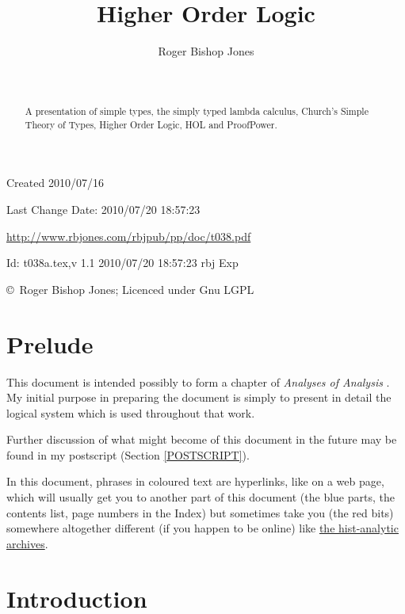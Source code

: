 \documentclass[11pt]{article}
\title{Higher Order Logic}
\author{Roger Bishop Jones}
\date{\ }
\begin{document}
\begin{titlepage}
\maketitle
\begin{abstract}
A presentation of simple types, the simply typed lambda calculus, Church's Simple Theory of Types, Higher Order Logic, HOL and ProofPower.
\end{abstract}
\vfill

\begin{centering}
{\footnotesize

Created 2010/07/16

Last Change $ $Date: 2010/07/20 18:57:23 $ $

\href{http://www.rbjones.com/rbjpub/pp/doc/t038.pdf}
{http://www.rbjones.com/rbjpub/pp/doc/t038.pdf}

$ $Id: t038a.tex,v 1.1 2010/07/20 18:57:23 rbj Exp $ $

\copyright\ Roger Bishop Jones; Licenced under Gnu LGPL

}%
\end{centering}

\thispagestyle{empty}
\end{titlepage}

\newpage
\addtocounter{page}{1}
{\parskip=0pt\tableofcontents}

\section{Prelude}

This document is intended possibly to form a chapter of {\it Analyses of Analysis} \cite{rbjb001}.
My initial purpose in preparing the document is simply to present in detail the logical system which is used throughout that work.

Further discussion of what might become of this document in the future may be found in my postscript (Section \ref{POSTSCRIPT}).

In this document, phrases in coloured text are hyperlinks, like on a web page, which will usually get you to another part of this document (the blue parts, the contents list, page numbers in the Index) but sometimes take you (the red bits) somewhere altogether different (if you happen to be online) like \href{http://rbjones.com/pipermail/hist-analytic_rbjones.com}{the hist-analytic archives}.

\section{Introduction}
\end{document}
